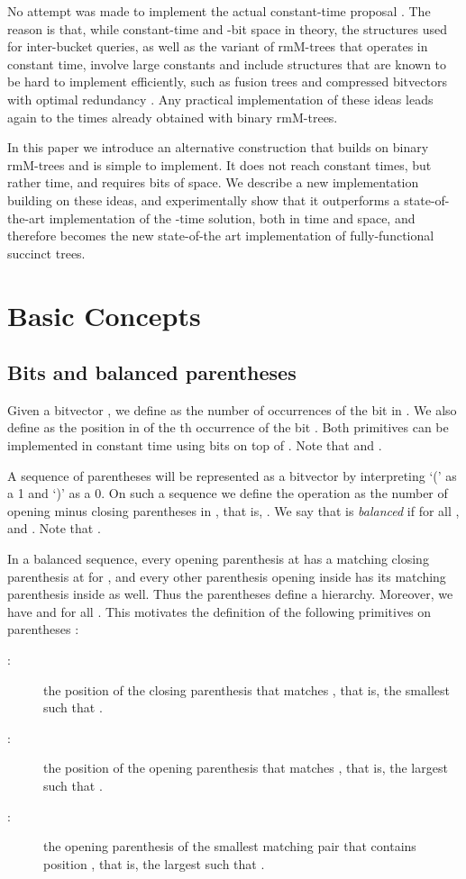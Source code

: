 \documentclass[11pt]{article}
\newcommand{\0}{\mathit{0}}
\newcommand{\1}{\mathit{1}}
\begin{document}
No attempt was made to implement the actual constant-time proposal \cite{NS14}.
The reason is that, while constant-time and -bit space in theory, the 
structures used for inter-bucket queries, as well as the variant of rmM-trees 
that operates in constant time, involve large constants and include structures
that are known to be hard to implement efficiently, such as fusion 
trees \cite{FW93} and compressed bitvectors with optimal redundancy 
\cite{Pat08}. Any practical
implementation of these ideas leads again to the  times already
obtained with binary rmM-trees.

In this paper we introduce an alternative construction that builds on binary
rmM-trees and is simple to implement. It does not reach constant times, but
rather  time, and requires  bits of space.
We describe a new implementation building on these ideas, and experimentally 
show that it outperforms a state-of-the-art implementation of the 
-time solution, both in time and space, and therefore becomes the
new state-of-the art implementation of fully-functional succinct trees.

\section{Basic Concepts}

\subsection{Bits and balanced parentheses}

Given a bitvector , we define  as the number of 
occurrences of the bit  in . We also define  as
the position in  of the th occurrence of the bit . Both primitives
can be implemented in constant time using  bits on top of  
\cite{Cla96}. Note that  and .

A sequence of  parentheses will be represented as a bitvector 
by interpreting `(' as a 1 and `)' as a 0. On such a sequence we define the
operation  as the number of opening minus closing parentheses in
, that is, .
We say that  is {\em balanced} if  for all , and 
. Note that .

In a balanced sequence, every opening parenthesis at  has a matching 
closing parenthesis at  for , and every other parenthesis opening
inside  has its matching parenthesis inside  as well.
Thus the parentheses define a hierarchy. Moreover, we have 
 and  for all . 
This motivates the definition of the following primitives on parentheses
\cite{MR01}:
\begin{description}
        \item[:] the position of the closing parenthesis that matches
		, that is, the smallest  such that
                .
        \item[:] the position of the opening parenthesis that matches
		, that is, the largest  such that
                .
        \item[:] the opening parenthesis of the smallest matching 
		pair that contains position , that is, the largest 
		such that .
\end{description}
\end{document}
